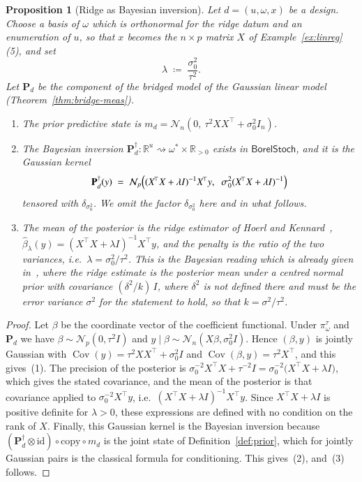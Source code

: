 \documentclass[11pt,a4paper]{article}
\theoremstyle{plain}
\newtheorem{proposition}[theorem]{Proposition}
\theoremstyle{definition}
\theoremstyle{remark}
\newcommand{\cat}[1]{\mathsf{#1}}
\newcommand{\id}{\mathrm{id}}
\newcommand{\R}{\mathbb{R}}
\newcommand{\Norm}{\mathcal{N}}
\newcommand{\BorelStoch}{\cat{BorelStoch}}
\begin{document}
\begin{proposition}[Ridge as Bayesian inversion]\label{prop:ridge}
Let $d = (u,\omega,x)$ be a design. Choose a basis of $\omega$ which is
orthonormal for the ridge datum and an enumeration of $u$, so that $x$ becomes
the $n \times p$ matrix $X$ of Example~\ref{ex:linreg}(5), and set
\[
\lambda \;\coloneqq\; \frac{\sigma_{0}^{2}}{\tau^{2}} .
\]
Let $\mathbf{P}_{d}$ be the component of the bridged model of the Gaussian
linear model (Theorem~\ref{thm:bridge-meas}).
\begin{enumerate}
\item The prior predictive state is
$m_{d} = \Norm_{n}(0,\ \tau^{2} X X^{\!\top} + \sigma_{0}^{2} I_{n})$.
\item The Bayesian inversion
$\mathbf{P}_{d}^{\dagger} \colon \R^{u} \rightsquigarrow
\omega^{*}\times\R_{>0}$ exists in $\BorelStoch$, and it is the Gaussian kernel
\[
\mathbf{P}_{d}^{\dagger}(y)
\;=\;
\Norm_{p}\Bigl(
(X^{\!\top}X + \lambda I)^{-1} X^{\!\top} y,
\;\;
\sigma_{0}^{2}(X^{\!\top}X + \lambda I)^{-1}
\Bigr)
\]
tensored with $\delta_{\sigma_{0}^{2}}$. We omit the factor
$\delta_{\sigma_{0}^{2}}$ here and in what follows.
\item The mean of the posterior is the ridge estimator of Hoerl and
Kennard~\cite[eq.~(2.1), p.~57]{hoerl_ridge_1970},
$\widehat{\beta}_{\lambda}(y) = (X^{\!\top}X + \lambda I)^{-1} X^{\!\top} y$,
and the penalty is the ratio of the two variances, i.e.\
$\lambda = \sigma_{0}^{2}/\tau^{2}$. This is the Bayesian reading which is
already given in~\cite[\S6, p.~64]{hoerl_ridge_1970}, where the ridge estimate
is the posterior mean under a centred normal prior with covariance
$(\delta^{2}/k)\,I$, where $\delta^{2}$ is not defined there and must be the
error variance $\sigma^{2}$ for the statement to hold, so that
$k = \sigma^{2}/\tau^{2}$.
\end{enumerate}
\end{proposition}

\begin{proof}
Let $\beta$ be the coordinate vector of the coefficient functional. Under
$\pi^{\tau}_{\omega}$ and $\mathbf{P}_{d}$ we have
$\beta \sim \Norm_{p}(0,\tau^{2}I)$ and
$y \mid \beta \sim \Norm_{n}(X\beta, \sigma_{0}^{2}I)$. Hence $(\beta,y)$ is
jointly Gaussian with
$\operatorname{Cov}(y) = \tau^{2}XX^{\!\top} + \sigma_{0}^{2}I$ and
$\operatorname{Cov}(\beta,y) = \tau^{2}X^{\!\top}$, and this gives~(1). The
precision of the posterior is
$\sigma_{0}^{-2}X^{\!\top}X + \tau^{-2}I
= \sigma_{0}^{-2}\bigl(X^{\!\top}X + \lambda I\bigr)$, which gives the stated
covariance, and the mean of the posterior is that covariance applied to
$\sigma_{0}^{-2}X^{\!\top}y$, i.e.\
$(X^{\!\top}X+\lambda I)^{-1}X^{\!\top}y$. Since $X^{\!\top}X + \lambda I$ is
positive definite for $\lambda>0$, these expressions are defined with no
condition on the rank of $X$. Finally, this Gaussian kernel is the Bayesian
inversion because
$(\mathbf{P}_{d}^{\dagger} \otimes \id) \circ \mathrm{copy} \circ m_{d}$ is the
joint state of Definition~\ref{def:prior}, which for jointly Gaussian pairs is
the classical formula for conditioning. This gives~(2), and~(3) follows.
\end{proof}
\end{document}
